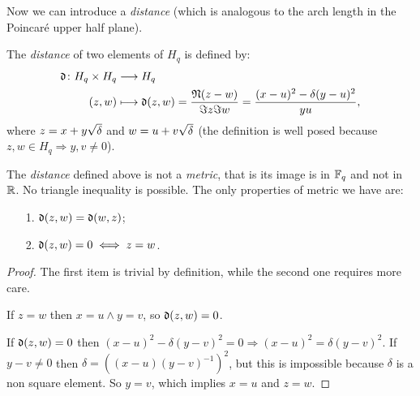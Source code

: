 Now we can introduce a {\it distance} (which is analogous to the arch length in the Poincaré upper half plane).
\begin{defn}
	The {\it distance} of two elements of $H_q$ is defined by:
	\begin{align*}
	\operatorname{\mathfrak{d}} \colon H_q \times H_q & \longrightarrow H_q \\ (z,w) & \longmapsto \operatorname{\mathfrak{d}} (z,w)= \frac{\operatorname{\mathfrak{N}} (z-w)}{\Im z \Im w}= \frac{(x-u)^2-\delta (y-u)^2}{yu},
\end{align*}
where $z=x+y\sqrt{\delta}$ and $w=u+v\sqrt{\delta}$ (the definition is well posed because $z,w \in H_q \Rightarrow y,v \neq 0$).
\end{defn}
\begin{rem}
The {\it distance} defined above is not a {\it metric}, that is its image is in ${\mathbb F}_q$ and not in ${\mathbb R}$. No triangle inequality is possible. The only properties of metric we have are: 
\begin{itemize}
\item [1.] $\operatorname{\mathfrak{d}} (z,w)=\operatorname{\mathfrak{d}} (w,z)$;
\item [2.] $\operatorname{\mathfrak{d}} (z,w) =0 \iff z=w$.
\end{itemize}
\begin{proof}
The first item is trivial by definition, while the second one requires more care.

If $z=w$ then $x=u \land y=v$, so $\operatorname{\mathfrak{d}} (z,w) =0$.

If $\operatorname{\mathfrak{d}} (z,w) =0$ then $(x-u)^2-\delta (y-v)^2=0 \Rightarrow (x-u)^2 = \delta (y-v)^2$.
If $y-v\neq 0$ then $\delta = ((x-u)(y-v)^{-1})^2$, but this is impossible because $\delta$ is a non square element.
So $y=v$, which implies $x=u$ and $z=w$.
\end{proof}
\end{rem}

